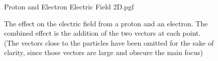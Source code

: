 \documentclass[main.tex]{subfiles}
\begin{document}
                \begin{figure}[h]
                    \centering
                    \scalebox{1.3}
                    {
                        \begin{adjustbox}{clip,trim=25mm 20mm 18mm 7mm}
                            {{Proton and Electron Electric Field 2D.pgf}}
                        \end{adjustbox}
                    }
                    \caption{The effect on the electric field from a proton and an electron. The combined effect is the addition of the two vectors at each point.\\(The vectors close to the particles have been omitted for the sake of clarity, since those vectors are large and obscure the main focus)}
                    \label{fig: Electron and Proton Field 2D}
                \end{figure}
                \FloatBarrier
\end{document}
